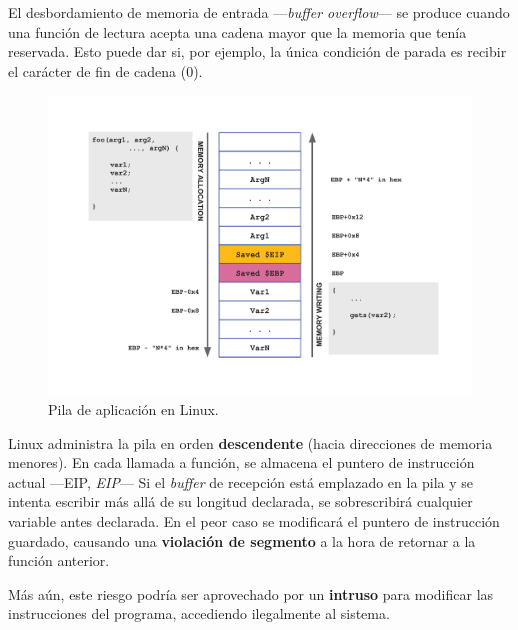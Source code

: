 El desbordamiento de memoria de entrada ---\textit{buffer overflow}--- se produce cuando una función de lectura acepta una cadena mayor que la memoria que tenía reservada. Esto puede dar si, por ejemplo, la única condición de parada es recibir el carácter de fin de cadena (0).

\smallskip

\begin{figure}[H]
	\noindent \begin{centering}
		\includegraphics[width=\linewidth]{capitulo5/stack}
		\par\end{centering}
	\smallskip
	\caption[Pila de aplicación en Linux]{\label{fig:stack} Pila de aplicación en Linux. \cite{zanero_cs}}
\end{figure} 

\smallskip

Linux administra la pila en orden \textbf{descendente} (hacia direcciones de memoria menores). En cada llamada a función, se almacena el puntero de instrucción actual ---\acrshort{EIP}, \textit{\acrlong{EIP}}--- Si el \textit{buffer} de recepción está emplazado en la pila y se intenta escribir más allá de su longitud declarada, se sobrescribirá cualquier variable antes declarada. En el peor caso se modificará el puntero de instrucción guardado, causando una \textbf{violación de segmento} a la hora de retornar a la función anterior.

Más aún, este riesgo podría ser aprovechado por un \textbf{intruso} para modificar las instrucciones del programa, accediendo ilegalmente al sistema.

\smallskip

